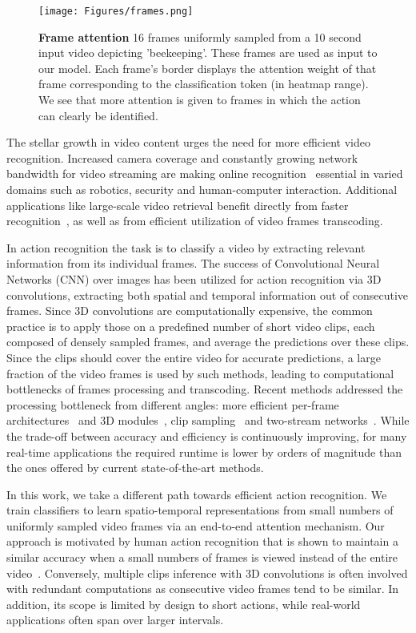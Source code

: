 \documentclass[10pt,twocolumn,letterpaper]{article}
\begin{document}
\begin{figure*} [t]
  \centering
  \texttt{[image: Figures/frames.png]}
  \caption{\textbf{Frame attention} 16 frames uniformly sampled from a 10 second input video depicting 'beekeeping'.  These frames are used as input to our model.  Each frame's border displays the attention weight of that frame corresponding to the classification token (in heatmap range).  We see that more attention is given to frames in which the action can clearly be identified. }
  \label{fig:frames_attn}
\end{figure*} 
\noindent 
The stellar growth in video content urges the need for more efficient video recognition.
Increased camera coverage and constantly growing network bandwidth for video streaming are making online recognition~\cite{liu2018ssnet,zolfaghari2018eco} essential in varied domains such as robotics, security and human-computer interaction. 
Additional applications like large-scale video retrieval benefit directly from faster recognition~\cite{araujo2017large}, as well as from efficient utilization of video frames transcoding. 

In action recognition the task is to classify a video by extracting relevant information from its individual frames.  
The success of Convolutional Neural Networks (CNN) over images has been utilized for action recognition via 3D convolutions, extracting both spatial and temporal information out of consecutive frames. 
Since 3D convolutions are computationally expensive,
the common practice is to apply those on a predefined number of short video clips, each composed of densely sampled frames, and average the predictions over these clips. 
Since the clips should cover the entire video for accurate predictions, a large fraction of the video frames is used by such methods, leading to computational bottlenecks of frames processing and transcoding. 
Recent methods addressed the processing bottleneck from different angles:
more efficient per-frame architectures~\cite{feichtenhofer2020x3d,ullah2021efficient} and 3D modules~\cite{tran2018closer,carreira2017quo}, clip sampling~\cite{zheng2020dynamic} and two-stream networks~\cite{zheng2020dynamic,simonyan2014two}.
While the trade-off between accuracy and efficiency is continuously improving, 
for many real-time applications the required runtime is lower by orders of magnitude than the ones offered by current state-of-the-art methods. 


In this work, we take a different path towards efficient action recognition.
We train classifiers to learn spatio-temporal representations from small numbers of uniformly sampled video frames via an end-to-end attention mechanism. 
Our approach is motivated by human action recognition that is shown to maintain a similar accuracy when a small numbers of frames is viewed instead of the entire video~\cite{schindler2008action}.
Conversely, multiple clips inference with 3D convolutions is often involved with redundant computations as consecutive video frames tend to be similar. In addition, its scope is limited by design to short actions, while real-world applications often span over larger intervals.
\end{document}
